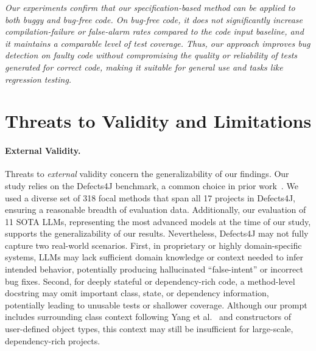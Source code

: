 \documentclass[acmsmall]{acmart}
\begin{document}
\vspace{-0.4em}
\begin{tcolorbox}[
    colback=black!5,
    colframe=black!20,
    boxrule=1pt,
    arc=2mm,
    title=RQ3 Answer,
    halign title=center,
    fonttitle=\bfseries\small,
    boxsep=1pt,
    left=3pt,
    right=3pt,
    top=3pt,
    bottom=3pt,
    toptitle=1pt,
    bottomtitle=1pt,
    lefttitle=3pt,
    righttitle=3pt,
]
\textit{Our experiments confirm that our specification-based method can be applied to both buggy and bug-free code. On bug-free code, it does not significantly increase compilation-failure or false-alarm rates compared to the code input baseline, and it maintains a comparable level of test coverage. Thus, our approach improves bug detection on faulty code without compromising the quality or reliability of tests generated for correct code, making it suitable for general use and tasks like regression testing.}
\end{tcolorbox}

\section{Threats to Validity and Limitations}

\paragraph{External Validity.}
Threats to \emph{external} validity concern the generalizability of our findings. Our study relies on the Defects4J benchmark, a common choice in prior work~\cite{UnitTestCaseGenTrans, A3TestIST, EmpEvalforLLMUTAutoGenTSE, OnLLMUTGenEvalASE2024}. We used a diverse set of 318 focal methods that span all 17 projects in Defects4J, ensuring a reasonable breadth of evaluation data. Additionally, our evaluation of 11 SOTA LLMs, representing the most advanced models at the time of our study, supports the generalizability of our results. Nevertheless, Defects4J may not fully capture two real-world scenarios. First, in proprietary or highly domain-specific systems, LLMs may lack sufficient domain knowledge or context needed to infer intended behavior, potentially producing hallucinated ``false-intent'' or incorrect bug fixes. Second, for deeply stateful or dependency-rich code, a method-level docstring may omit important class, state, or dependency information, potentially leading to unusable tests or shallower coverage. Although our prompt includes surrounding class context following Yang et al.~\cite{OnLLMUTGenEvalASE2024} and constructors of user-defined object types, this context may still be insufficient for large-scale, dependency-rich projects.
\end{document}
